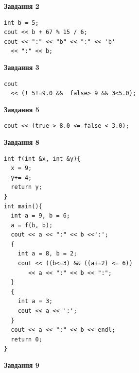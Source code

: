 \documentclass[12pt, ukrainian]{article}
\begin{document}
{\begin {large}
\begin{minipage}[t]{7.0cm}
\end{minipage}
\vline \hspace{1mm}
\begin{minipage}[t]{11.0cm}

\begin{center}
\textbf{Завдання 2}
\end{center}
\vspace{-8mm}

\begin{verbatim}
int b = 5;
cout << b + 67 % 15 / 6;
cout << ":" << "b" << ":" << 'b' 
  << ":" << b;
\end{verbatim}



\begin{center}
\textbf{Завдання 3}
\end{center}
\vspace{-8mm}

\begin{verbatim}
cout 
  << (! 5!=9.0 &&  false> 9 && 3<5.0);
\end{verbatim}



\begin{center}
\textbf{Завдання 5}
\end{center}
\vspace{-8mm}

\begin{verbatim}
cout << (true > 8.0 <= false < 3.0);
\end{verbatim}



\begin{center}
\textbf{Завдання 8}
\end{center}
\vspace{-8mm}

\begin{verbatim}
int f(int &x, int &y){
  x = 9;
  y+= 4;
  return y;
}
int main(){
  int a = 9, b = 6;
  a = f(b, b);
  cout << a << ":" << b <<':';
  {
    int a = 8, b = 2;
    cout << ((b<=3) && ((a+=2) <= 6))
       << a << ":" << b << ":";
  }
  {
    int a = 3;
    cout << a << ':';
  }
  cout << a << ":" << b << endl;
  return 0;
}
\end{verbatim}

\end{minipage}


\begin{minipage}[t]{7.0cm}

\begin{center}
\textbf{Завдання 9}
\end{center}
\vspace{-8mm}


\end{minipage}
\end{large}}
\end{document}
